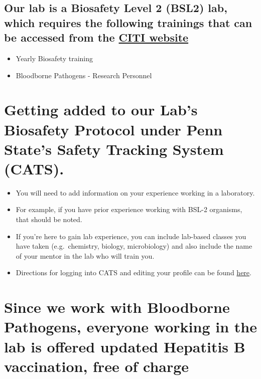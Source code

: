 \documentclass[
]{book}
\providecommand{\tightlist}{%
  \setlength{\itemsep}{0pt}\setlength{\parskip}{0pt}}
\begin{document}
\subsection{\texorpdfstring{Our lab is a Biosafety Level 2 (BSL2) lab, which requires the following trainings that can be accessed from the \href{https://citi.psu.edu/}{CITI website}}{Our lab is a Biosafety Level 2 (BSL2) lab, which requires the following trainings that can be accessed from the CITI website}}\label{our-lab-is-a-biosafety-level-2-bsl2-lab-which-requires-the-following-trainings-that-can-be-accessed-from-the-citi-website}

\begin{itemize}
\tightlist
\item
  Yearly Biosafety training
\item
  Bloodborne Pathogens - Research Personnel
\end{itemize}

\section{Getting added to our Lab's Biosafety Protocol under Penn State's Safety Tracking System (CATS).}\label{getting-added-to-our-labs-biosafety-protocol-under-penn-states-safety-tracking-system-cats.}

\begin{itemize}
\tightlist
\item
  You will need to add information on your experience working in a laboratory.
\item
  For example, if you have prior experience working with BSL-2 organisms, that should be noted.
\item
  If you're here to gain lab experience, you can include lab-based classes you have taken (e.g.~chemistry, biology, microbiology) and also include the name of your mentor in the lab who will train you.
\item
  Directions for logging into CATS and editing your profile can be found \href{https://researchsupport.psu.edu/orp/ibc/events-training-resources/update-personnel-experience-in-cats-safety/}{here}.
\end{itemize}

\section{Since we work with Bloodborne Pathogens, everyone working in the lab is offered updated Hepatitis B vaccination, free of charge}\label{since-we-work-with-bloodborne-pathogens-everyone-working-in-the-lab-is-offered-updated-hepatitis-b-vaccination-free-of-charge}
\end{document}
